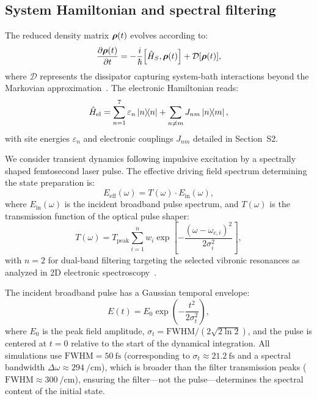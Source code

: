 \documentclass[11pt,a4paper]{article}
\begin{document}
\subsection{System Hamiltonian and spectral filtering}
\label{sec:SI_pulse}

The reduced density matrix $\vb*{\rho}(t)$ evolves according to:
\begin{equation}
\pdv{\vb*{\rho}(t)}{t} = -\frac{i}{\hbar}\comm{\hat{H}_S}{\vb*{\rho}(t)} + \mathcal{D}[\vb*{\rho}(t)],
\label{eq:SI_master_eq}
\end{equation}
where $\mathcal{D}$ represents the dissipator capturing system-bath interactions beyond the Markovian approximation~\cite{Tanimura1989}. The electronic Hamiltonian reads:
\begin{equation}
\hat{H}_{\mathrm{el}} = \sum_{n=1}^{7} \varepsilon_n \dyad{n} + \sum_{n \neq m} J_{nm} \dyad{n}{m},
\label{eq:SI_excitonic_hamiltonian}
\end{equation}
with site energies $\varepsilon_n$ and electronic couplings $J_{nm}$ detailed in Section~S2.

We consider transient dynamics following impulsive excitation by a spectrally shaped femtosecond laser pulse. The effective driving field spectrum determining the state preparation is:
\begin{equation}
E_{\mathrm{eff}}(\omega) = T(\omega) \cdot E_{\mathrm{in}}(\omega),
\label{eq:SI_filtered_spectral_density}
\end{equation}
where $E_{\mathrm{in}}(\omega)$ is the incident broadband pulse spectrum, and $T(\omega)$ is the transmission function of the optical pulse shaper:
\begin{equation}
T(\omega) = T_{\mathrm{peak}} \sum_{i=1}^{n} w_i \exp\!\left[-\frac{(\omega - \omega_{c,i})^2}{2\sigma_i^2}\right],
\label{eq:SI_transmission_function}
\end{equation}
with $n=2$ for dual-band filtering targeting the selected vibronic resonances as analyzed in 2D electronic spectroscopy~\cite{Cho2005}.

The incident broadband pulse has a Gaussian temporal envelope:
\begin{equation}
E(t) = E_0 \exp\!\left(-\frac{t^2}{2\sigma_t^2}\right),
\label{eq:SI_pulse_envelope}
\end{equation}
where $E_0$ is the peak field amplitude, $\sigma_t = \mathrm{FWHM}/(2\sqrt{2\ln 2})$, and the pulse is centered at $t = 0$ relative to the start of the dynamical integration. All simulations use $\mathrm{FWHM} = \SI{50}{\femto\second}$ (corresponding to $\sigma_t \approx \SI{21.2}{\femto\second}$ and a spectral bandwidth $\Delta\omega \approx \SI{294}{\per\centi\meter}$), which is broader than the filter transmission peaks ($\mathrm{FWHM} \approx \SI{300}{\per\centi\meter}$), ensuring the filter—not the pulse—determines the spectral content of the initial state.
\end{document}
